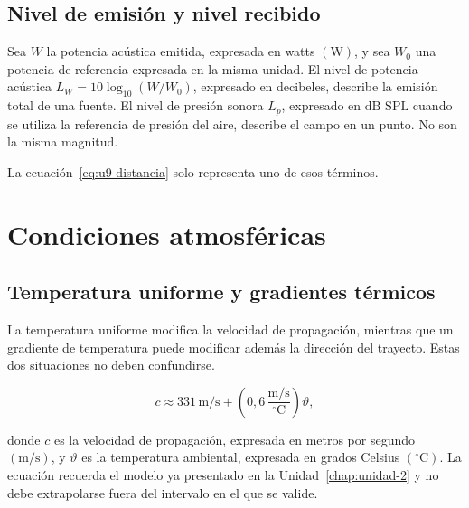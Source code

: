 \subsection{Nivel de emisión y nivel recibido}
\label{sec:u9-emision-recepcion}

Sea \(W\) la potencia acústica emitida, expresada en watts \((\text{W})\), y
sea \(W_0\) una potencia de referencia expresada en la misma unidad. El nivel
de potencia acústica \(L_W=10\log_{10}(W/W_0)\), expresado en decibeles,
describe la emisión total de una fuente. El nivel de presión sonora \(L_p\),
expresado en \(\text{dB SPL}\) cuando se utiliza la referencia de presión del
aire, describe el campo en un punto. No son la misma magnitud.

 La ecuación~\eqref{eq:u9-distancia}
solo representa uno de esos términos.

\section{Condiciones atmosféricas}
\label{sec:u9-atmosfera}

\subsection{Temperatura uniforme y gradientes térmicos}
\label{sec:u9-temperatura}

La temperatura uniforme modifica la velocidad de propagación, mientras que un
gradiente de temperatura puede modificar además la dirección del trayecto.
Estas dos situaciones no deben confundirse.


\begin{equation}
    c\approx
    331\,\text{m}/\text{s}
    +\left(0{,}6\,
    \frac{\text{m}/\text{s}}{^{\circ}\text{C}}\right)\vartheta,
    \label{eq:u9-velocidad-temperatura}
\end{equation}

donde \(c\) es la velocidad de propagación, expresada en metros por segundo
\((\text{m}/\text{s})\), y \(\vartheta\) es la temperatura ambiental,
expresada en grados Celsius \((^{\circ}\text{C})\). La ecuación recuerda el
modelo ya presentado en la Unidad~\ref{chap:unidad-2} y no debe extrapolarse
fuera del intervalo
en el que se valide.

